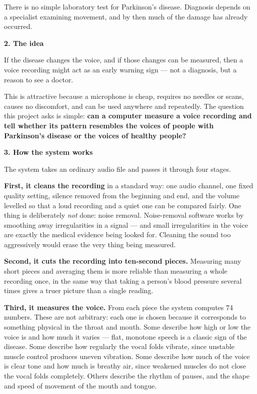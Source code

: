 \documentclass[11pt,a4paper]{report}
\newcommand{\sheadEN}[1]{\par\vspace{4pt}%
\noindent{\color{honest}\rule[0.5ex]{16pt}{2.4pt}}\hspace{7pt}%
{\large\bfseries\color{ink}#1}\par\vspace{2pt}}
\newcommand{\stage}[1]{{\color{honest}\textbf{#1}}}
\begin{document}
There is no simple laboratory test for Parkinson's disease. Diagnosis
depends on a specialist examining movement, and by then much of the
damage has already occurred.

\sheadEN{2. The idea}
If the disease changes the voice, and if those changes can be
measured, then a voice recording might act as an early warning sign
--- not a diagnosis, but a reason to see a doctor.

This is attractive because a microphone is cheap, requires no needles
or scans, causes no discomfort, and can be used anywhere and
repeatedly. The question this project asks is simple: \textbf{can a
computer measure a voice recording and tell whether its pattern
resembles the voices of people with Parkinson's disease or the voices
of healthy people?}

\sheadEN{3. How the system works}
The system takes an ordinary audio file and passes it through four
stages.

\stage{First, it cleans the recording} in a standard way: one audio
channel, one fixed quality setting, silence removed from the beginning
and end, and the volume levelled so that a loud recording and a quiet
one can be compared fairly. One thing is deliberately \emph{not} done:
noise removal. Noise-removal software works by smoothing away
irregularities in a signal --- and small irregularities in the voice
are exactly the medical evidence being looked for. Cleaning the sound
too aggressively would erase the very thing being measured.

\stage{Second, it cuts the recording into ten-second pieces.}
Measuring many short pieces and averaging them is more reliable than
measuring a whole recording once, in the same way that taking a
person's blood pressure several times gives a truer picture than a
single reading.

\stage{Third, it measures the voice.} From each piece the system
computes 74 numbers. These are not arbitrary: each one is chosen
because it corresponds to something physical in the throat and mouth.
Some describe how high or low the voice is and how much it varies ---
flat, monotone speech is a classic sign of the disease. Some describe
how regularly the vocal folds vibrate, since unstable muscle control
produces uneven vibration. Some describe how much of the voice is
clear tone and how much is breathy air, since weakened muscles do not
close the vocal folds completely. Others describe the rhythm of
pauses, and the shape and speed of movement of the mouth and tongue.
\end{document}
